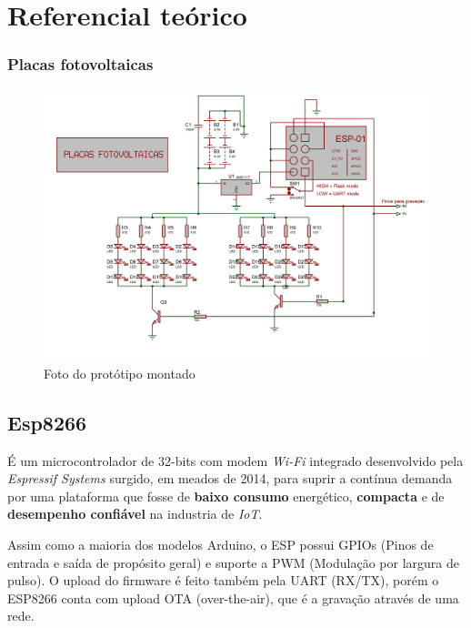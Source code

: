 \documentclass[
	12pt,				%
	openany,			%
	twoside,			%
	a4paper,			%
	english,			%
	french,				%
	spanish,			%
	brazil,				%
	]{abntex2}
\begin{document}
\part{Referencial teórico}


%

\section{Placas fotovoltaicas}

\begin{figure}[ht!]
  \includegraphics[width=450pt]{images/circuit.png}
  \caption{Foto do protótipo montado}
\end{figure}

\chapter{Esp8266}
É um microcontrolador de 32-bits com modem \textit{Wi-Fi} integrado desenvolvido pela \textit{Espressif Systems}
surgido, em meados de 2014, para suprir a contínua demanda por uma plataforma que fosse de \textsf{\textbf{baixo consumo}} 
energético, \textsf{\textbf{compacta}} e de \textsf{\textbf{desempenho confiável}} na industria de \textit{IoT}.

Assim como a maioria dos modelos Arduino, o ESP possui GPIOs (Pinos de entrada e saída de propósito geral)
e suporte a PWM (Modulação por largura de pulso). O upload do firmware é feito também pela UART (RX/TX), 
porém o ESP8266 conta com upload OTA (over-the-air), que é a gravação através de uma rede.  
\end{document}
